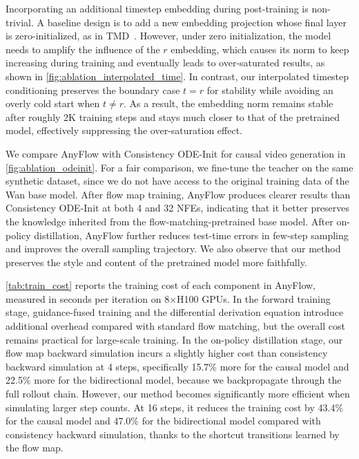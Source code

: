  Incorporating an additional timestep embedding during post-training is non-trivial. A baseline design is to add a new embedding projection whose final layer is zero-initialized, as in TMD~\cite{nie2026transition}. However, under zero initialization, the model needs to amplify the influence of the $r$ embedding, which causes its norm to keep increasing during training and eventually leads to over-saturated results, as shown in \cref{fig:ablation_interpolated_time}. In contrast, our interpolated timestep conditioning preserves the boundary case $t=r$ for stability while avoiding an overly cold start when $t\neq r$. As a result, the embedding norm remains stable after roughly 2K training steps and stays much closer to that of the pretrained model, effectively suppressing the over-saturation effect.


We compare AnyFlow with Consistency ODE-Init for causal video generation in \cref{fig:ablation_odeinit}. For a fair comparison, we fine-tune the teacher on the same synthetic dataset, since we do not have access to the original training data of the Wan base model. After flow map training, AnyFlow produces clearer results than Consistency ODE-Init at both 4 and 32 NFEs, indicating that it better preserves the knowledge inherited from the flow-matching-pretrained base model. After on-policy distillation, AnyFlow further reduces test-time errors in few-step sampling and improves the overall sampling trajectory. We also observe that our method preserves the style and content of the pretrained model more faithfully.


 \cref{tab:train_cost} reports the training cost of each component in AnyFlow, measured in seconds per iteration on 8$\times$H100 GPUs. In the forward training stage, guidance-fused training and the differential derivation equation introduce additional overhead compared with standard flow matching, but the overall cost remains practical for large-scale training. In the on-policy distillation stage, our flow map backward simulation incurs a slightly higher cost than consistency backward simulation at 4 steps, specifically 15.7\% more for the causal model and 22.5\% more for the bidirectional model, because we backpropagate through the full rollout chain. However, our method becomes significantly more efficient when simulating larger step counts. At 16 steps, it reduces the training cost by 43.4\% for the causal model and 47.0\% for the bidirectional model compared with consistency backward simulation, thanks to the shortcut transitions learned by the flow map.
